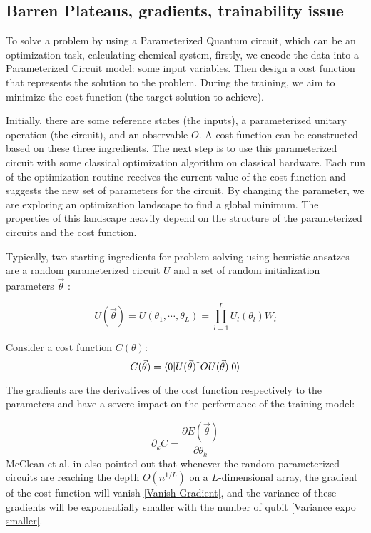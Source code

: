 \subsection{Barren Plateaus, gradients, trainability issue}

To solve a problem by using a Parameterized Quantum circuit, which can be an optimization task, calculating chemical system, firstly, we encode the data into a Parameterized Circuit model: some input variables. 
Then design a cost function that represents the solution to the problem. During the training, we aim to minimize the cost function (the target solution to achieve).

Initially, there are some reference states (the inputs), a parameterized unitary operation (the circuit), and an observable $O$.
A cost function can be constructed based on these three ingredients.
The next step is to use this parameterized circuit with some classical optimization algorithm on classical hardware.
Each run of the optimization routine receives the current value of the cost function and suggests the new set of parameters for the circuit.
By changing the parameter, we are exploring an optimization landscape to find a global minimum.
The properties of this landscape heavily depend on the structure of the parameterized circuits and the cost function.

Typically, two starting ingredients for problem-solving using heuristic ansatzes are a random parameterized circuit $U$ and a set of random initialization parameters $\vec{\theta}$ \cite{mccleanBarrenPlateausQuantum2018}:

\begin{equation}\label{Parameterized Circuit}
    U(\vec{\theta})
    = U(\theta_1, \cdots, \theta_L)
    = \prod_{l=1}^L U_l(\theta_l)W_l
\end{equation}

Consider a cost function $C(\theta)$:
\begin{equation}\label{Cost function}
    C(\vec{\theta})
    = \bra{0} U(\vec{\theta})^\dagger OU(\vec{\theta}) \ket{0}
\end{equation}

The gradients are the derivatives of the cost function respectively to the parameters and have a severe impact on the performance of the training model:

\begin{equation}
    \partial_k C = \frac{\partial E(\vec{\theta})}{\partial\theta_k}
\end{equation}
McClean et al. in \cite{mccleanBarrenPlateausQuantum2018} also pointed out that whenever the random parameterized circuits are reaching the depth $O(n^{1/L})$ on a $L$-dimensional array, the gradient of the cost function will vanish \ref{Vanish Gradient}, and the variance of these gradients will be exponentially smaller with the number of qubit \ref{Variance expo smaller}. 

